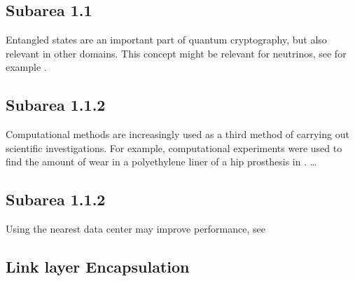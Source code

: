 \subsection{Subarea 1.1}
Entangled states are an important part of quantum cryptography, but also relevant in other domains. This concept might be relevant for neutrinos, see for example \cite{kim_small-mass_2016}.

\subsection{Subarea 1.1.2}
Computational methods are increasingly used as a third method of carrying out
scientific investigations. For example, computational experiments were used to
find the amount of wear in a polyethylene liner of a hip prosthesis in \cite{maguire_jr_new_2014}.
…

\subsection{Subarea 1.1.2}
Using the nearest data center may improve performance, see \cite{bogdanov_nearest_2015}


\subsection{Link layer Encapsulation}
\label{sec:llencap}







